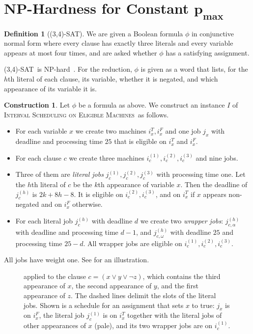 \documentclass[11pt,a4paper]{article}
\theoremstyle{definition}
\newtheorem{definition}{Definition}
\newtheorem{construction}{Construction}
\newcommand{\pmax}{p_{\max}}
\newcommand{\ProbEM}{\textsc{Interval Scheduling on Eligible Machines}}
\newcommand{\SAT}{\textsc{(3,4)-SAT}}
\newcommand{\NP}{\textnormal{\textsf{NP}}}
\begin{document}
\section{\textsf{NP}-Hardness for Constant \texorpdfstring{$\boldsymbol{\pmax}$}{pmax}}\label{sec:nph}

\begin{definition}[\SAT]
We are given a Boolean formula $\phi$ in conjunctive normal form where every clause has
exactly three literals and every variable appears at most four times, and are asked
whether $\phi$ has a satisfying assignment.
\end{definition}
\SAT\ is \NP-hard~\cite{Tovey84}.
For the reduction, $\phi$ is given as a word that lists, for the $h$th literal of each
clause, its variable, whether it is negated, and which appearance of its variable it is.

\begin{construction}\label{const:nph}
Let $\phi$ be a formula as above. We construct an instance $I$ of \ProbEM\ as follows.
\begin{itemize}
\item For each variable $x$ we create two machines $i_x^T,i_x^F$ and one job $j_x$ with
  deadline and processing time $25$ that is eligible on $i_x^T$ and $i_x^F$.
\item For each clause $c$ we create three machines $i_c^{(1)},i_c^{(2)},i_c^{(3)}$ and
  nine jobs.
\item Three of them are \emph{literal jobs} $j_c^{(1)},j_c^{(2)},j_c^{(3)}$ with
  processing time one. Let the $h$th literal of $c$ be the $k$th appearance of variable
  $x$. Then the deadline of $j_c^{(h)}$ is $2k+8h-8$. It is eligible on
  $i_c^{(2)},i_c^{(3)}$, and on $i_x^T$ if $x$ appears non-negated and on $i_x^F$
  otherwise.
\item For each literal job $j_c^{(h)}$ with deadline $d$ we create two \emph{wrapper
  jobs}: $j_{c,\alpha}^{(h)}$ with deadline and processing time $d-1$, and
  $j_{c,\omega}^{(h)}$ with deadline $25$ and processing time $25-d$. All wrapper jobs are
  eligible on $i_c^{(1)},i_c^{(2)},i_c^{(3)}$.
\end{itemize}
All jobs have weight one. See  for an illustration.
\end{construction}

\begin{figure}[tb]
    \centering
    
    \caption{ applied to the clause $c=(x\vee y\vee\neg z)$, which contains
    the third appearance of $x$, the second appearance of $y$, and the first appearance of
    $z$. The dashed lines delimit the slots of the literal jobs. Shown is a schedule for an
    assignment that sets $x$ to true: $j_x$ is on $i_x^F$, the literal job $j_c^{(1)}$ is
    on $i_x^T$ together with the literal jobs of other appearances of $x$ (pale), and its
    two wrapper jobs are on $i_c^{(1)}$.}
    \label{fig:pmax}
\end{figure}
\end{document}
